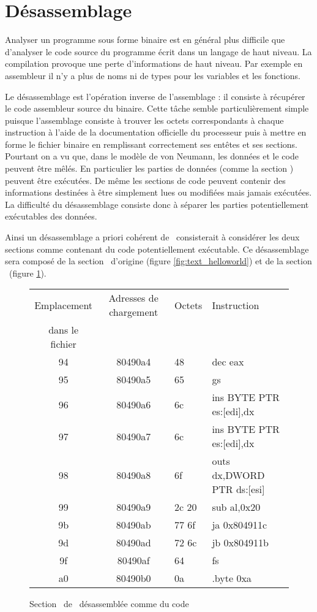 \section{Désassemblage}
Analyser un programme sous forme binaire est en général plus difficile que d'analyser le code source du programme écrit dans un langage de haut niveau.
La compilation provoque une perte d'informations de haut niveau.
Par exemple en assembleur il n'y a plus de noms ni de types pour les variables et les fonctions. 

Le désassemblage est l'opération inverse de l'assemblage : il consiste à récupérer le code assembleur source du binaire.
Cette tâche semble particulièrement simple puisque l'assemblage consiste à trouver les octets correspondants à chaque instruction à l'aide de la documentation officielle du processeur puis à mettre en forme le fichier binaire en remplissant correctement ses entêtes et ses sections.
Pourtant on a vu que, dans le modèle de von Neumann, les données et le code peuvent être mêlés. 
En particulier les parties de données (comme la section \pdata) peuvent être exécutées. 
De même les sections de code peuvent contenir des informations destinées à être simplement lues ou modifiées mais jamais exécutées.
La difficulté du désassemblage consiste donc à séparer les parties potentiellement exécutables des données.

Ainsi un désassemblage a priori cohérent de \helloworld\ consisterait à considérer les deux sections comme contenant du code potentiellement exécutable. Ce désassemblage sera composé de la section \ptext\ d'origine (figure \ref{fig:text_helloworld}) et de la section \pdata\ (figure \ref{fig:data_exec_helloworld}).

\begin{figure}[h]
\begin{center}
\begin{tabular}{|c|c|l|l|}
\hline
Emplacement & Adresses de chargement & Octets & Instruction\\ 
dans le fichier & &  & \\ 
\hline
94 & 80490a4 & 48    & dec    eax			\\
95 & 80490a5 & 65    & gs				\\
96 & 80490a6 & 6c    & ins    BYTE PTR es:[edi],dx	\\
97 & 80490a7 & 6c    & ins    BYTE PTR es:[edi],dx	\\
98 & 80490a8 & 6f    & outs   dx,DWORD PTR ds:[esi]	\\
99 & 80490a9 & 2c 20 & sub    al,0x20			\\
9b & 80490ab & 77 6f & ja     0x804911c			\\
9d & 80490ad & 72 6c & jb     0x804911b			\\
9f & 80490af & 64    & fs				\\
a0 & 80490b0 & 0a    & .byte 0xa			\\
\hline
\end{tabular}
\end{center}
\caption{Section \pdata\ de \helloworld\ désassemblée comme du code}
\label{fig:data_exec_helloworld}
\end{figure}

